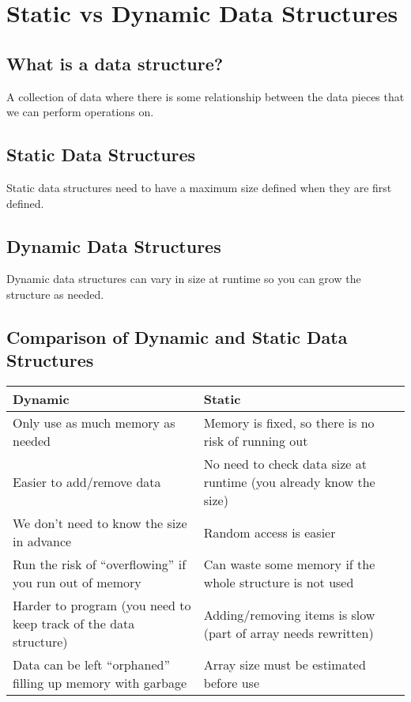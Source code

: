 \section{Static vs Dynamic Data Structures}\label{sec:static_vs_dynamic_data_structures}

\subsection{What is a data structure?}\label{sub:what_is_a_data_structure_}

A collection of data where there is some relationship between the data pieces that we can perform operations on.

\subsection{Static Data Structures}\label{sub:static_data_structures}

Static data structures need to have a maximum size defined when they are first defined.

\subsection{Dynamic Data Structures}\label{sub:dynamic_data_structures}

Dynamic data structures can vary in size at runtime so you can grow the structure as needed.

\subsection{Comparison of Dynamic and Static Data Structures}\label{sub:comparison_of_dynamic_and_static_data_structures}

\begin{tabular}{p{7cm}p{7cm}}
    \toprule
    Dynamic                                                          & Static                                                            \\
    \midrule
    Only use as much memory as needed                                & Memory is fixed, so there is no risk of running out               \\
    Easier to add/remove data                                        & No need to check data size at runtime (you already know the size) \\
    We don't need to know the size in advance                        & Random access is easier                                           \\
    Run the risk of ``overflowing'' if you run out of memory         & Can waste some memory if the whole structure is not used          \\
    Harder to program (you need to keep track of the data structure) & Adding/removing items is slow (part of array needs rewritten)     \\
    Data can be left ``orphaned'' filling up memory with garbage     & Array size must be estimated before use                           \\
    \bottomrule
\end{tabular}

